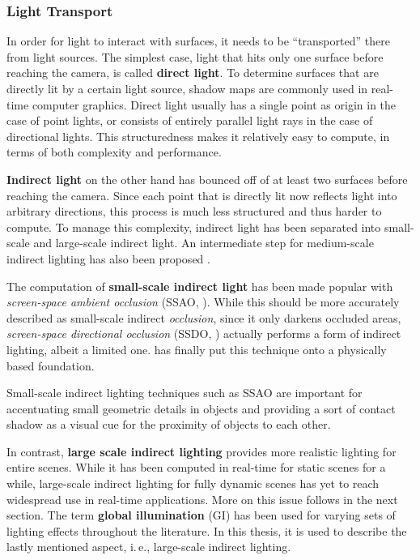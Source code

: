 \subsubsection{Light Transport}

In order for light to interact with surfaces, it needs to be ``transported'' there from light sources. The simplest case, light that hits only one surface before reaching the camera, is called \textbf{direct light}. To determine surfaces that are directly lit by a certain light source, shadow maps are commonly used in real-time computer graphics. Direct light usually has a single point as origin in the case of point lights, or consists of entirely parallel light rays in the case of directional lights. This structuredness makes it relatively easy to compute, in terms of both complexity and performance.

\textbf{Indirect light} on the other hand has bounced off of at least two surfaces before reaching the camera. Since each point that is directly lit now reflects light into arbitrary directions, this process is much less structured and thus harder to compute. To manage this complexity, indirect light has been separated into small-scale and large-scale indirect light. An intermediate step for medium-scale indirect lighting has also been proposed \citep{reed:2012:mediumAO}.

The computation of \textbf{small-scale indirect light} has been made popular with \textit{screen-space ambient occlusion} (SSAO, \cite{Mittring:2007:Cryengine2}). While this should be more accurately described as small-scale indirect \textit{occlusion}, since it only darkens occluded areas, \textit{screen-space directional occlusion} (SSDO, \cite{Ritschel:2009:SSDO}) actually performs a form of indirect lighting, albeit a limited one. \citet{jimenez:2016:AO} has finally put this technique onto a physically based foundation.

Small-scale indirect lighting techniques such as SSAO are important for accentuating small geometric details in objects and providing a sort of contact shadow as a visual cue for the proximity of objects to each other.

In contrast, \textbf{large scale indirect lighting} provides more realistic lighting for entire scenes. While it has been computed in real-time for static scenes for a while, large-scale indirect lighting for fully dynamic scenes has yet to reach widespread use in real-time applications. More on this issue follows in the next section. The term \textbf{global illumination} (GI) has been used for varying sets of lighting effects throughout the literature. In this thesis, it is used to describe the lastly mentioned aspect, i.\,e., large-scale indirect lighting.



